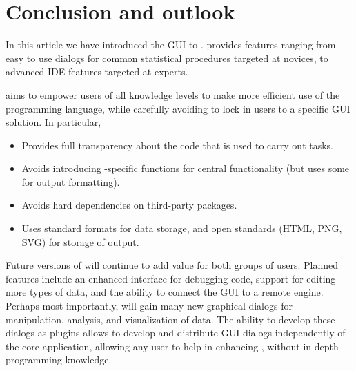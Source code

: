 \section{Conclusion and outlook}
\label{sec:conclusion_summary}
In this article we have introduced the  GUI to .  provides features ranging
from easy to use dialogs for common statistical procedures targeted at  novices, to advanced
IDE features targeted at  experts.

 aims to empower users of all knowledge levels to make more efficient use of the 
 programming language, while carefully avoiding to lock in users to a specific
GUI solution. In particular, 
\begin{itemize}
 \item Provides full transparency about the  code that is used to carry out tasks.
 \item Avoids introducing -specific  functions for central functionality (but uses some for output formatting).
 \item Avoids hard dependencies on third-party  packages.
 \item Uses standard  formats \citep[see][]{Rdataimexport} for data storage, and open standards (HTML, PNG, SVG) for storage of output.
\end{itemize}

Future versions of  will continue to add value for both groups of users. Planned features include
an enhanced interface for debugging  code, support for editing more types of data, and the
ability to connect the  GUI to a remote  engine. Perhaps most importantly,  will
gain many new graphical dialogs for manipulation, analysis, and visualization of data. The ability to
develop these dialogs as plugins allows to develop and distribute GUI dialogs
independently of the  core application, allowing any user to help in enhancing , without in-depth
programming knowledge.
